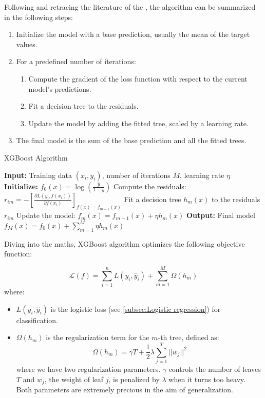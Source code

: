 \documentclass[12pt]{article}
\begin{document}
Following and retracing the literature of the \cite{IntroductionToBoostedTrees}, the algorithm can be summarized in the following steps:
 
\begin{enumerate}
    \item Initialize the model with a base prediction, usually the mean of the target values. 
    \item For a predefined number of iterations:
    \begin{enumerate}
        \item Compute the gradient of the loss function with respect to the current model's predictions.
        \item Fit a decision tree to the residuals.
        \item Update the model by adding the fitted tree, scaled by a learning rate.
    \end{enumerate}
    \item The final model is the sum of the base prediction and all the fitted trees.
\end{enumerate}

\begin{algorithm}[H]
\caption{XGBoost Algorithm}
\begin{algorithmic}
\STATE \textbf{Input:} Training data $(x_i, y_i)$, number of iterations $M$, learning rate $\eta$
\STATE \textbf{Initialize:} $f_0(x) = \log ( \frac{\bar{y}}{1 - \bar{y}})$
    \State Compute the residuals: $r_{im} = -\left[ \frac{\partial L(y_i, f(x_i))}{\partial f(x_i)} \right]_{f(x)=f_{m-1}(x)}$
    \State Fit a decision tree $h_m(x)$ to the residuals $r_{im}$
    \State Update the model: $f_m(x) = f_{m-1}(x) + \eta h_m(x)$
\ENDFOR
\STATE \textbf{Output:} Final model $f_M(x) = f_0(x) + \sum_{m=1}^{M} \eta h_m(x)$
\end{algorithmic}
\end{algorithm}
\FloatBarrier



\noindent Diving into the maths, XGBoost algorithm optimizes the following objective function:
 
\begin{equation}\label{equa:Gradient Boosting objective function}
\mathcal{L}(f) = \sum_{i=1}^{n} L(y_i, \hat{y}_i) + \sum_{m=1}^{M} \Omega(h_m) 
\end{equation}
where:
\begin{itemize}
    \item $L(y_i, \hat{y}_i)$ is the logistic loss (see \autoref{subsec:Logistic regression}) for classification.
    \item $\Omega(h_m)$ is the regularization term for the $m$-th tree, defined as:
    \begin{equation}
    \Omega(h_m) = \gamma T + \frac{1}{2} \lambda \sum_{j=1}^{T} ||w_j||^2
    \end{equation}
    where we have two regularization parameters. $\gamma$ controls the number of leaves $T$ and $w_j$, the weight of leaf $j$, is penalized by $\lambda$ when it turns too heavy. Both parameters are extremely precious in the aim of generalization.
\end{itemize}
\end{document}
